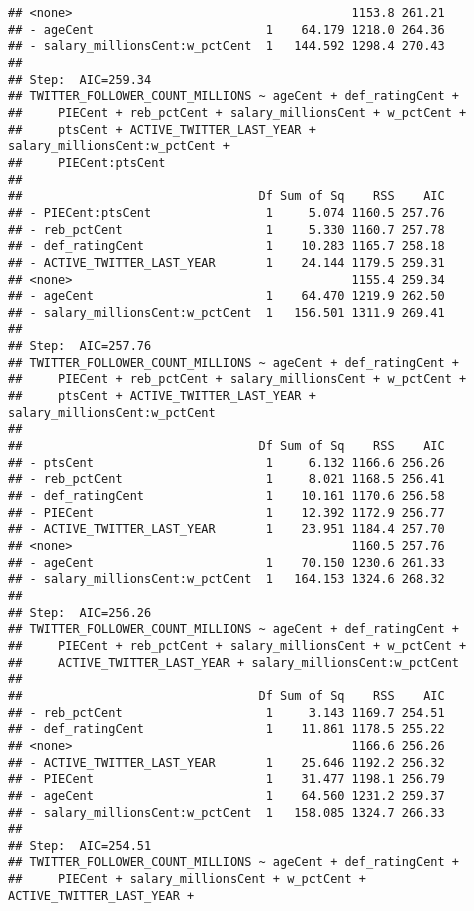 \documentclass[]{article}
\begin{document}
\begin{verbatim}
## <none>                                       1153.8 261.21
## - ageCent                        1    64.179 1218.0 264.36
## - salary_millionsCent:w_pctCent  1   144.592 1298.4 270.43
## 
## Step:  AIC=259.34
## TWITTER_FOLLOWER_COUNT_MILLIONS ~ ageCent + def_ratingCent + 
##     PIECent + reb_pctCent + salary_millionsCent + w_pctCent + 
##     ptsCent + ACTIVE_TWITTER_LAST_YEAR + salary_millionsCent:w_pctCent + 
##     PIECent:ptsCent
## 
##                                 Df Sum of Sq    RSS    AIC
## - PIECent:ptsCent                1     5.074 1160.5 257.76
## - reb_pctCent                    1     5.330 1160.7 257.78
## - def_ratingCent                 1    10.283 1165.7 258.18
## - ACTIVE_TWITTER_LAST_YEAR       1    24.144 1179.5 259.31
## <none>                                       1155.4 259.34
## - ageCent                        1    64.470 1219.9 262.50
## - salary_millionsCent:w_pctCent  1   156.501 1311.9 269.41
## 
## Step:  AIC=257.76
## TWITTER_FOLLOWER_COUNT_MILLIONS ~ ageCent + def_ratingCent + 
##     PIECent + reb_pctCent + salary_millionsCent + w_pctCent + 
##     ptsCent + ACTIVE_TWITTER_LAST_YEAR + salary_millionsCent:w_pctCent
## 
##                                 Df Sum of Sq    RSS    AIC
## - ptsCent                        1     6.132 1166.6 256.26
## - reb_pctCent                    1     8.021 1168.5 256.41
## - def_ratingCent                 1    10.161 1170.6 256.58
## - PIECent                        1    12.392 1172.9 256.77
## - ACTIVE_TWITTER_LAST_YEAR       1    23.951 1184.4 257.70
## <none>                                       1160.5 257.76
## - ageCent                        1    70.150 1230.6 261.33
## - salary_millionsCent:w_pctCent  1   164.153 1324.6 268.32
## 
## Step:  AIC=256.26
## TWITTER_FOLLOWER_COUNT_MILLIONS ~ ageCent + def_ratingCent + 
##     PIECent + reb_pctCent + salary_millionsCent + w_pctCent + 
##     ACTIVE_TWITTER_LAST_YEAR + salary_millionsCent:w_pctCent
## 
##                                 Df Sum of Sq    RSS    AIC
## - reb_pctCent                    1     3.143 1169.7 254.51
## - def_ratingCent                 1    11.861 1178.5 255.22
## <none>                                       1166.6 256.26
## - ACTIVE_TWITTER_LAST_YEAR       1    25.646 1192.2 256.32
## - PIECent                        1    31.477 1198.1 256.79
## - ageCent                        1    64.560 1231.2 259.37
## - salary_millionsCent:w_pctCent  1   158.085 1324.7 266.33
## 
## Step:  AIC=254.51
## TWITTER_FOLLOWER_COUNT_MILLIONS ~ ageCent + def_ratingCent + 
##     PIECent + salary_millionsCent + w_pctCent + ACTIVE_TWITTER_LAST_YEAR + 

\end{verbatim}
\end{document}
